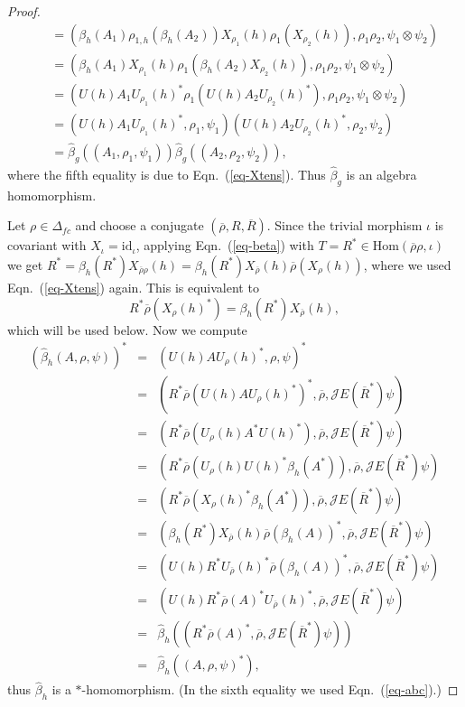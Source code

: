 \documentclass[12pt]{article}
\theoremstyle{definition}
\theoremstyle{definition}
\theoremstyle{remark}
\def\2#1{{\mathcal #1}}
\def\ol#1{{\overline #1}}
\newcommand{\Hom}{\mathrm{Hom}}
\def\id{\mathrm{id}}
\begin{document}
\begin{proof}
\begin{eqnarray*}
  &&= (\beta_h(A_1)\rho_{1,h}(\beta_h(A_2))X_{\rho_1}(h)\rho_1(X_{\rho_2}(h)),\rho_1\rho_2,\psi_1\otimes\psi_2) \\
  &&= (\beta_h(A_1)X_{\rho_1}(h)\rho_1(\beta_h(A_2)X_{\rho_2}(h)),\rho_1\rho_2,\psi_1\otimes\psi_2) \\
  &&= (U(h)A_1U_{\rho_1}(h)^*\rho_1(U(h)A_2U_{\rho_2}(h)^*),\rho_1\rho_2,\psi_1\otimes\psi_2) \\
  &&= (U(h)A_1U_{\rho_1}(h)^*,\rho_1,\psi_1)(U(h)A_2U_{\rho_2}(h)^*,\rho_2,\psi_2) \\
  &&= \widehat{\beta}_g((A_1,\rho_1,\psi_1))\widehat{\beta}_g((A_2,\rho_2,\psi_2)),
\end{eqnarray*}
where the fifth equality is due to Eqn.\ (\ref{eq-Xtens}). Thus $\widehat{\beta}_g$ is an algebra
homomorphism.   

Let $\rho\in\Delta_{fc}$ and choose a conjugate $(\ol{\rho},R,\ol{R})$. Since the trivial morphism
$\iota$ is covariant with $X_\iota=\id_\iota$, applying Eqn.\ (\ref{eq-beta}) with
$T=R^*\in\Hom(\ol{\rho}\rho,\iota)$ we get
$R^*=\beta_h(R^*)X_{\ol{\rho}\rho}(h)=\beta_h(R^*)X_{\ol{\rho}}(h)\ol{\rho}(X_\rho(h))$, 
where we used Eqn.\ (\ref{eq-Xtens}) again. This is equivalent to
\begin{equation}\label{eq-abc} R^*\overline{\rho}(X_\rho(h)^*)=\beta_h(R^*)X_{\overline{\rho}}(h),
\end{equation}
which will be used below. Now
we compute
\begin{eqnarray*}
 (\widehat{\beta}_h(A,\rho,\psi))^* &=&  (U(h)AU_\rho(h)^*,\rho,\psi)^* \\
   &=& (R^*\overline{\rho}(U(h)AU_\rho(h)^*)^*,\ol\rho,\2JE(\overline{R}^*)\psi) \\
   &=& (R^*\overline{\rho}(U_\rho(h)A^*U(h)^*),\ol\rho,\2JE(\overline{R}^*)\psi) \\
   &=& (R^*\overline{\rho}(U_\rho(h)U(h)^*\beta_h(A^*)),\ol\rho,\2JE(\overline{R}^*)\psi) \\
   &=& (R^*\overline{\rho}(X_\rho(h)^*\beta_h(A^*)),\ol\rho,\2JE(\overline{R}^*)\psi) \\
   &=& (\beta_h(R^*)X_{\overline{\rho}}(h)\overline{\rho}(\beta_h(A))^*,\ol\rho,\2JE(\overline{R}^*)\psi) \\
   &=& (U(h)R^*U_{\overline{\rho}}(h)^*\overline{\rho}(\beta_h(A))^*,\ol\rho,\2JE(\overline{R}^*)\psi) \\
   &=& (U(h)R^*\overline{\rho}(A)^*U_{\overline{\rho}}(h)^*,\ol\rho,\2JE(\overline{R}^*)\psi) \\
   &=& \widehat{\beta}_h((R^*\overline{\rho}(A)^*,\ol\rho,\2JE(\overline{R}^*)\psi)) \\
   &=& \widehat{\beta}_h((A,\rho,\psi)^*),
\end{eqnarray*}
thus $\widehat{\beta}_h$ is a $*$-homomorphism. (In the sixth equality we used Eqn.\ (\ref{eq-abc}).)


\end{proof}
\end{document}
